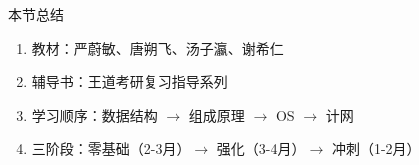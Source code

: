 \documentclass[10pt, aspectratio=169]{beamer}
\begin{document}
\begin{frame}{本节总结}
    \begin{enumerate}
        \item 教材：严蔚敏、唐朔飞、汤子瀛、谢希仁
        \item 辅导书：王道考研复习指导系列
        \item 学习顺序：数据结构 $\to$ 组成原理 $\to$ OS $\to$ 计网
        \item 三阶段：零基础（2-3月）$\to$ 强化（3-4月）$\to$ 冲刺（1-2月）
    \end{enumerate}
\end{frame}
\end{document}
